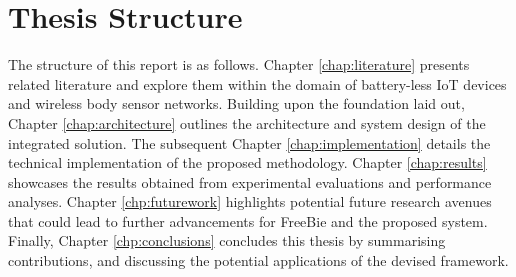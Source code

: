 \section{Thesis Structure}
The structure of this report is as follows. Chapter \ref{chap:literature} presents related literature and explore them within the domain of battery-less IoT devices and wireless body sensor networks. Building upon the foundation laid out, Chapter \ref{chap:architecture} outlines the architecture and system design of the integrated solution. The subsequent Chapter \ref{chap:implementation} details the technical implementation of the proposed methodology. Chapter \ref{chap:results} showcases the results obtained from experimental evaluations and performance analyses.  Chapter \ref{chp:futurework} highlights potential future research avenues that could lead to further advancements for FreeBie and the proposed system. Finally, Chapter \ref{chp:conclusions} concludes this thesis by summarising contributions, and discussing the potential applications of the devised framework.